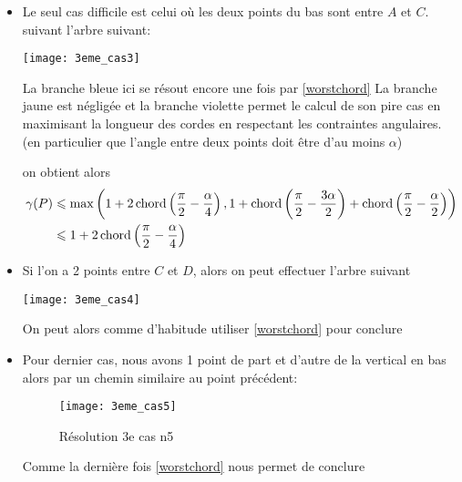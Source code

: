 \begin{itemize}
\begin{itemize}
\item \label{3cas21} Le seul cas difficile est celui où les deux points du bas sont entre $A$ et $C$.
suivant l'arbre suivant:

  \texttt{[image: 3eme\_cas3]}

La branche bleue ici se résout encore une fois par \ref{worstchord}
La branche jaune est négligée
et la branche violette permet le calcul de son pire cas en maximisant la longueur des cordes en respectant les contraintes angulaires. (en particulier que l'angle entre deux points doit être d'au moins $\alpha$)

on obtient alors
\begin{align*}
\gamma(P) &\leqslant \max\left(1+2\operatorname{chord}\left(\frac{\pi}{2} - \frac{\alpha}{4}\right), 1 + \operatorname{chord}\left(\frac{\pi}{2} - \frac{3\alpha}{2}\right) + \operatorname{chord}\left(\frac{\pi}{2} - \frac{\alpha}{2}\right)\right) \\
&\leqslant 1+2\operatorname{chord}\left(\frac{\pi}{2} - \frac{\alpha}{4}\right)
\end{align*}

\item \label{3cas22} Si l'on a 2 points entre $C$ et $D$, alors on peut effectuer l'arbre suivant

  \texttt{[image: 3eme\_cas4]}

On peut alors comme d'habitude utiliser \ref{worstchord} pour conclure

\item \label{3cas23} Pour dernier cas, nous avons 1 point de part et d'autre de la vertical en bas alors par un chemin similaire au point précédent:

\begin{figure}[h!]
  \centering
  \texttt{[image: 3eme\_cas5]}
  \caption{Résolution 3e cas n5}
  \label{fig:3eme_cas5}
\end{figure}

Comme la dernière fois \ref{worstchord} nous permet de conclure

\end{itemize}
\end{itemize}

